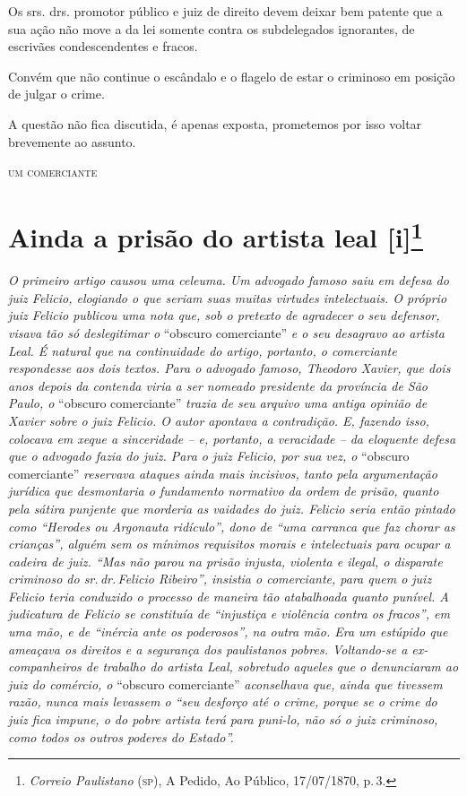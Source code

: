 Os srs. drs. promotor público e juiz de direito devem deixar bem patente
que a sua ação não move a da lei somente contra os subdelegados
ignorantes, de escrivães condescendentes e fracos.

Convém que não continue o escândalo e o flagelo de estar o criminoso em
posição de julgar o crime.

A questão não fica discutida, é apenas exposta, prometemos por isso
voltar brevemente ao assunto.

\begin{flushright}
\textsc{um comerciante}
\end{flushright}

\chapter{Ainda a prisão do artista leal {[}i{]}\footnote{\emph{Correio Paulistano} (\textsc{sp}), A Pedido, Ao Público,
  17/07/1870, p.\,3.}} %

\begin{didascalia}
\emph{O primeiro artigo causou uma celeuma. Um advogado famoso saiu em
defesa do juiz Felicio, elogiando o que seriam suas muitas virtudes
intelectuais. O próprio juiz Felicio publicou uma nota que, sob o
pretexto de agradecer o seu defensor, visava tão só deslegitimar o}
``obscuro comerciante'' \emph{e o seu desagravo ao artista Leal. É natural
que na continuidade do artigo, portanto, o comerciante respondesse aos
dois textos. Para o advogado famoso, Theodoro Xavier, que dois anos
depois da contenda viria a ser nomeado presidente da província de São
Paulo, o} ``obscuro comerciante'' \emph{trazia de seu arquivo uma antiga
opinião de Xavier sobre o juiz Felicio. O autor apontava a contradição.
E, fazendo isso, colocava em xeque a sinceridade -- e, portanto, a
veracidade -- da eloquente defesa que o advogado fazia do juiz. Para o
juiz Felicio, por sua vez, o} ``obscuro comerciante'' \emph{reservava
ataques ainda mais incisivos, tanto pela argumentação jurídica que
desmontaria o fundamento normativo da ordem de prisão, quanto pela
sátira punjente que morderia as vaidades do juiz. Felicio seria então
pintado como ``Herodes ou Argonauta ridículo'', dono de ``uma carranca que
faz chorar as crianças'', alguém sem os mínimos requisitos morais e
intelectuais para ocupar a cadeira de juiz. ``Mas não parou na prisão
injusta, violenta e ilegal, o disparate criminoso do sr.\,dr.\,Felicio
Ribeiro'', insistia o comerciante, para quem o juiz Felicio teria
conduzido o processo de maneira tão atabalhoada quanto punível. A
judicatura de Felicio se constituía de ``injustiça e violência contra os
fracos'', em uma mão, e de ``inércia ante os poderosos'', na outra mão. Era
um estúpido que ameaçava os direitos e a segurança dos paulistanos
pobres. Voltando-se a ex-companheiros de trabalho do artista Leal,
sobretudo aqueles que o denunciaram ao juiz do comércio, o} ``obscuro
comerciante'' \emph{aconselhava que, ainda que tivessem razão, nunca mais
levassem o ``seu desforço até o crime, porque se o crime do juiz fica
impune, o do pobre artista terá para puni-lo, não só o juiz criminoso,
como todos os outros poderes do Estado''.}
\end{didascalia}


